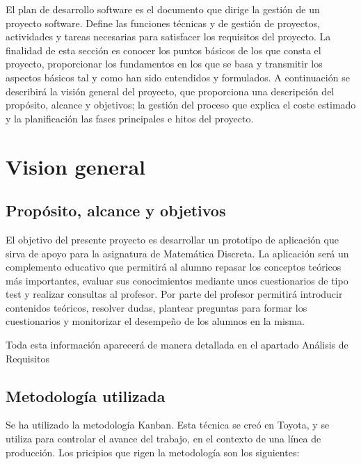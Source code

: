 \documentclass[openright,twoside,10pt]{book}
\begin{document}
    El plan de desarrollo software es el documento que dirige la gestión de
    un proyecto software. Define las funciones técnicas y de gestión de
    proyectos, actividades y tareas necesarias para satisfacer los
    requisitos del proyecto. La finalidad de esta sección es conocer los
    puntos básicos de los que consta el proyecto, proporcionar los
    fundamentos en los que se basa y transmitir los aspectos básicos tal y
    como han sido entendidos y formulados. A continuación se describirá la
    visión general del proyecto, que proporciona una descripción del
    propósito, alcance y objetivos; la gestión del proceso que explica el
    coste estimado y la planificación las fases principales e hitos del
    proyecto.
    
    \section{Vision general}\label{vision-general}
    
    \subsection{Propósito, alcance y
    objetivos}\label{propuxf3sito-alcance-y-objetivos}
    
    El objetivo del presente proyecto es desarrollar un prototipo de
    aplicación que sirva de apoyo para la asignatura de Matemática Discreta.
    La aplicación será un complemento educativo que permitirá al alumno
    repasar los conceptos teóricos más importantes, evaluar sus
    conocimientos mediante unos cuestionarios de tipo test y realizar
    consultas al profesor. Por parte del profesor permitirá introducir
    contenidos teóricos, resolver dudas, plantear preguntas para formar los
    cuestionarios y monitorizar el desempeño de los alumnos en la misma.
    
    Toda esta información aparecerá de manera detallada en el apartado
    Análisis de Requisitos
    
    \subsection{Metodología utilizada}\label{metodologuxeda-utilizada}
    
    Se ha utilizado la metodología Kanban. Esta técnica se creó en Toyota, y
    se utiliza para controlar el avance del trabajo, en el contexto de una
    línea de producción. Los pricipios que rigen la metodología son los
    siguientes:
    
\end{document}
